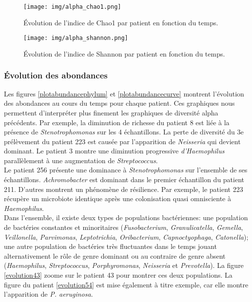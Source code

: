 \documentclass[12pt,a4paper]{article}
\begin{document}
 \vfill
\begin{figure}[H]
\begin{center}
\texttt{[image: img/alpha\_chao1.png]}\hfill
\end{center}
\caption{Évolution de l'indice de Chao1 par patient en fonction du temps.}
\label{alphaChao1}
\end{figure}

\begin{figure}[H]
\begin{center}
\texttt{[image: img/alpha\_shannon.png]}\hfill
\end{center}
\caption{Évolution de l'indice de Shannon par patient en fonction du temps.}
\label{alphaShannon}
\end{figure}


\subsubsection{Évolution des abondances}
Les figures \ref{plotabundancephylum} et \ref{plotabundancecurve} montrent l’évolution des abondances au cours du temps pour chaque patient. Ces graphiques nous permettent d’interpréter plus finement les graphiques de diversité alpha précédents.
Par exemple, la diminution de richesse du patient 8 est liée à la présence de \textit{Stenotrophomonas} sur les 4 échantillons.
La perte de diversité du 3e prélèvement du patient 223 est causée par l'apparition de \textit{Neisseria} qui devient dominant.
Le patient 3 montre une diminution progressive \textit{d’Haemophilus} parallèlement à une augmentation de \textit{Streptococcus}. \\
Le patient 256 présente une dominance à \textit{Stenotrophomonas} sur l'ensemble de ses échantillons. \textit{Achromobacter} est dominant dans le premier échantillon du patient 211.
D’autres montrent un phénomène de résilience. Par exemple, le patient 223 récupère un microbiote identique après une colonisation quasi omnisciente à \textit{Haemophilus}. \\
Dans l’ensemble, il existe deux types de populations bactériennes: une population de bactéries constantes et minoritaires (\textit{Fusobacterium}, \textit{Granulicatella}, \textit{Gemella}, \textit{Veillonella}, \textit{Parvimonas}, \textit{Leptotrichia}, \textit{Oribacterium}, \textit{Capnoctyophaga}, \textit{Catonella}); une autre population de bactéries très fluctuantes dans le temps jouant alternativement le rôle de genre dominant ou au contraire de genre absent (\textit{Haemophilus}, \textit{Streptococcus},  \textit{Porphyromonas}, \textit{Neisseria} et \textit{Prevotella}).
La figure \ref{evolution43} zoome sur le patient 43 pour montrer ces deux populations. La figure du patient \ref{evolution54} est mise également à titre exemple, car elle montre l’apparition de \textit{P. aeruginosa}. \\
\end{document}
